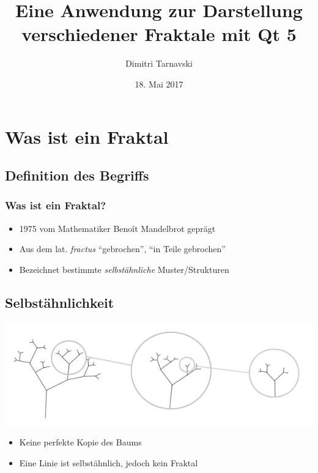 \documentclass[unknownkeysallowed]{beamer}
\title{Eine Anwendung zur Darstellung verschiedener Fraktale mit Qt 5}
\author{Dimitri Tarnavski}
\date{18. Mai 2017}
\begin{document}
\maketitle

\tableofcontents[hideallsubsections]


\section{Was ist ein Fraktal}

\subsection{Definition des Begriffs}

\begin{frame}
  \frametitle{Was ist ein Fraktal?}
  \begin{itemize}
    \item 1975 vom Mathematiker Benoît Mandelbrot geprägt
    \item Aus dem lat. \emph{fractus} "`gebrochen"', "`in Teile gebrochen"'
    \item Bezeichnet bestimmte \emph{selbstähnliche} Muster/Strukturen
  \end{itemize}
\end{frame}

\subsection{Selbstähnlichkeit}

\begin{frame}
  \includegraphics[width=1\textwidth]{images/fractal1.jpg}
  \begin{itemize}
    \item Keine perfekte Kopie des Baums
    \item Eine Linie ist selbstähnlich, jedoch kein Fraktal
  \end{itemize}
\end{frame}
\end{document}
